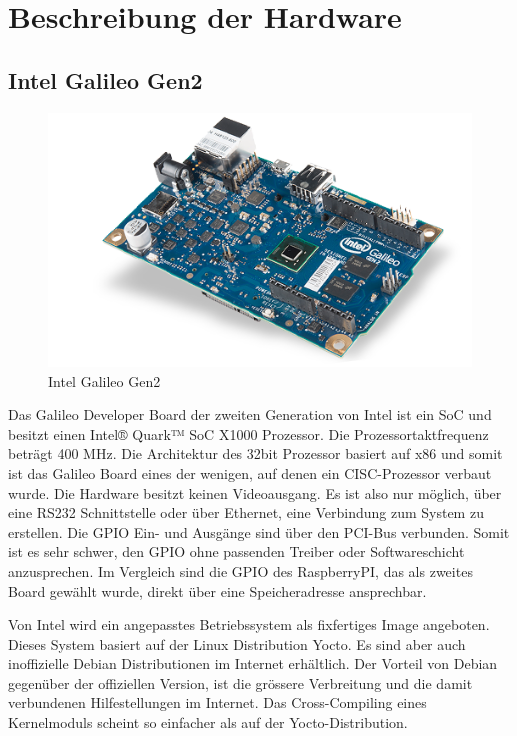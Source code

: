 \section{Beschreibung der Hardware}
\label{beschreibung_hardware}
\subsection{Intel Galileo Gen2}

\begin{figure}
\centering
\includegraphics[scale=0.5]{images/iot_galileo.png}
\caption{Intel Galileo Gen2\cite{intel_galileo_image}}
\label{fig:Intel Galileo Gen2}
\end{figure}

Das Galileo Developer Board\cite{intel_datasheet_galileo} der zweiten Generation von
Intel ist ein SoC und besitzt einen Intel® Quark™ SoC X1000 Prozessor. Die Prozessortaktfrequenz beträgt 400 MHz. Die Architektur des 32bit Prozessor basiert auf x86\cite{intel_datasheet} und somit ist das Galileo
Board eines der wenigen, auf denen ein CISC-Prozessor verbaut wurde. Die Hardware
besitzt keinen Videoausgang. Es ist also nur möglich, über eine RS232 Schnittstelle oder über Ethernet,
eine Verbindung zum System zu erstellen. Die GPIO Ein- und Ausgänge sind über den
PCI-Bus verbunden. Somit ist es sehr schwer, den GPIO ohne passenden Treiber oder
Softwareschicht anzusprechen. Im Vergleich sind die GPIO des RaspberryPI, das als zweites Board gewählt wurde,
direkt über eine Speicheradresse ansprechbar.
\par
Von Intel wird ein angepasstes Betriebssystem als fixfertiges Image angeboten. Dieses System basiert auf
der Linux Distribution Yocto. Es sind aber auch inoffizielle Debian Distributionen im
Internet erhältlich. Der Vorteil von Debian gegenüber der offiziellen Version, ist die
grössere Verbreitung und die damit verbundenen Hilfestellungen im Internet. Das Cross-Compiling eines Kernelmoduls scheint so einfacher als auf der Yocto-Distribution.



